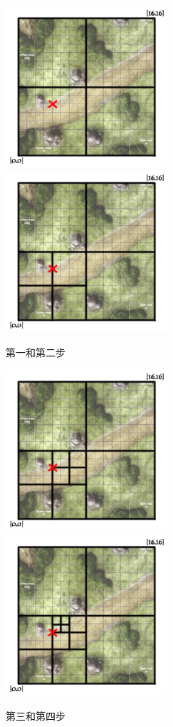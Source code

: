 \documentclass[master]{njnuthesis}
\begin{document}
\begin{figure}[h]
\centering
\includegraphics[angle=0,width=6cm]{pic//map2.png}
\includegraphics[angle=0,width=6cm]{pic//map3.png}
\caption{第一和第二步}
\end{figure}

\begin{figure}[h]
\centering
\includegraphics[angle=0,width=6cm]{pic//map4.png}
\includegraphics[angle=0,width=6cm]{pic//map5.png}
\caption{第三和第四步}
\end{figure}
\end{document}
